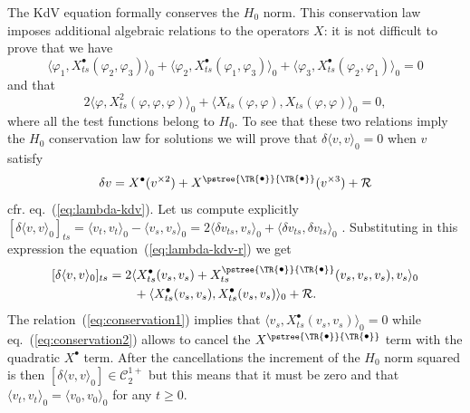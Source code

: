 \documentclass[a4paper]{article}
\newcommand{\1}{{\bf 1}}
\newcommand{\der}{\delta}
\newcommand{\CC}{\mathcal{C}}
\newcommand{\crr}{\mathcal R}
\newcommand{\troot}{\bullet}
\newcommand{\tsnode}{\TR{\raisebox{0.5pt}{\ensuremath{\scriptstyle\bullet}}}}
\newcommand{\tsroot}{\ensuremath{\scriptstyle\bullet}}
\newcommand{\aabb}{\pstree{\tsnode}{\tsnode}}
\newcommand{\CC}{\mathcal{C}}
\newcommand{\der}{\delta}
\begin{document}
The KdV equation formally conserves the $H_0$ norm. This conservation
law imposes additional algebraic relations to the operators $X$:
it is not difficult to prove that we have
\begin{equation}
  \label{eq:conservation1}
\langle \varphi_1,  X^\troot_{ts}(\varphi_2,\varphi_3)\rangle_0 
+\langle \varphi_2, X^\troot_{ts}(\varphi_1,\varphi_3)\rangle_0 
+\langle \varphi_3,  X^\troot_{ts}(\varphi_2,\varphi_1)\rangle_0 
= 0  
\end{equation}
and that
\begin{equation}
  \label{eq:conservation2}
2 \langle \varphi, X^2_{ts}(\varphi,\varphi,\varphi)\rangle_0
+   \langle X_{ts}(\varphi,\varphi), X_{ts}(\varphi,\varphi)\rangle_0 = 0  , 
\end{equation}
where all the test functions belong to $H_0$. To see that these two
relations imply the $H_0$ conservation law for solutions we will prove
that $\der \langle v,v \rangle_0  = 0$ when $v$ satisfy
\begin{equation}
  \label{eq:lambda-kdv-r}
\der v = X^{\tsroot}(v^{\times 2}) + X^{\aabb}(v^{\times 3}) + \crr  
\end{equation}
cfr. eq.~(\ref{eq:lambda-kdv}). Let us compute explicitly 
$[\der \langle v,v \rangle_0]_{ts}   = \langle v_t,v_t \rangle_0 - \langle v_s,v_s \rangle_0
=  2 \langle \der v_{ts},v_s \rangle_0 + \langle \der v_{ts},\der v_{ts} \rangle_0    $
.
Substituting in this expression the equation~(\ref{eq:lambda-kdv-r}) we get
\begin{equation*}
  \begin{split}
[\der \langle v,v \rangle_0]_{ts}
& = 2  \langle X^\troot_{ts}(v_s,v_s)+X^{\aabb}_{ts}(v_s,v_s,v_s)   ,v_s \rangle_0 
\\ & \qquad + \langle X^\troot_{ts}(v_s,v_s),X^\troot_{ts}(v_s,v_s) \rangle_0 
 + \crr  .
  \end{split}
\end{equation*}
The relation~(\ref{eq:conservation1}) 
implies that $\langle v_s,
X^\troot_{ts}(v_s,v_s) \rangle_0 = 0$ while eq.~(\ref{eq:conservation2})
allows to cancel the $X^{\aabb}$ term with the quadratic $X^\troot$ term. After the
cancellations the increment of the $H_0$ norm squared is  then $[\der
\langle v,v \rangle_0] \in \CC_2^{1+} $ but this means that it must be
zero and that $\langle v_t,v_t \rangle_0 = \langle v_0,v_0 \rangle_0$
for any $t \ge 0$.
\end{document}
